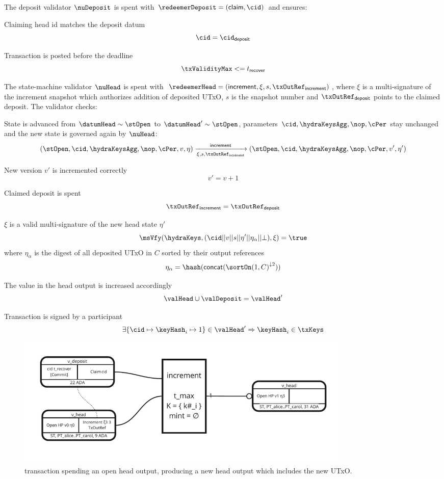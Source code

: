\noindent The deposit validator $\nuDeposit$ is spent with
$\redeemerDeposit = (\mathsf{claim}, \mathsf{\cid})$ and ensures:
\begin{menumerate}
  \item Claiming head id matches the deposit datum
  \[
    \cid = \cid_{\mathsf{deposit}}
  \]
  \item Transaction is posted before the deadline
  \[
    \txValidityMax <= t_{\mathsf{recover}}
  \]
\end{menumerate}

\noindent The state-machine validator $\nuHead$ is spent with
$\redeemerHead = (\mathsf{increment}, \xi, s, \txOutRef_{\mathsf{increment}})$,
where $\xi$ is a multi-signature of the increment snapshot which authorizes
addition of deposited UTxO, $s$ is the snapshot number and
$\txOutRef_{\mathsf{deposit}}$ points to the claimed deposit. The validator
checks:
\begin{menumerate}
  \item State is advanced from $\datumHead \sim \stOpen$ to
  $\datumHead' \sim \stOpen$, parameters $\cid,\hydraKeysAgg,\nop,\cPer$
  stay unchanged and the new state is governed again by $\nuHead$:
  \[
	(\stOpen,\cid,\hydraKeysAgg,\nop,\cPer,v,\eta) \xrightarrow[\xi, s, \txOutRef_{\mathsf{increment}}]{\mathsf{increment}} (\stOpen,\cid,\hydraKeysAgg,\nop,\cPer,v',\eta')
  \]
  \item New version $v'$ is incremented correctly
  \[
	v' = v + 1
  \]
  \item Claimed deposit is spent
  \[
    \txOutRef_{\mathsf{increment}} = \txOutRef_{\mathsf{deposit}}
  \]
  \item $\xi$ is a valid multi-signature of the new head state $\eta'$
  \[
	\msVfy(\hydraKeys,(\cid || v || s || \eta' || \eta_\alpha || \bot),\xi) = \true
  \]
  where $\eta_\alpha$ is the digest of all deposited UTxO in $C$ sorted by their output
  references
  \[
	\eta_\alpha = \hash(\mathsf{concat}({\sortOn(1, C)}^{\downarrow2}))
  \]
  \item The value in the head output is increased accordingly
  \[
	\valHead \cup \valDeposit = \valHead'
  \]
  \item Transaction is signed by a participant
  \[
	\exists \{\cid \mapsto \keyHash_{i} \mapsto 1\} \in \valHead' \Rightarrow \keyHash_{i} \in \txKeys
  \]
\end{menumerate}


\begin{figure}
  \centering
  \includegraphics[width=0.8\textwidth]{Hydra/Protocol/Figures/incrementTx.pdf}
  \caption{\mtxIncrement{} transaction spending an open head output,
	producing a new head output which includes the new UTxO.}\label{fig:incrementTx}
\end{figure}

